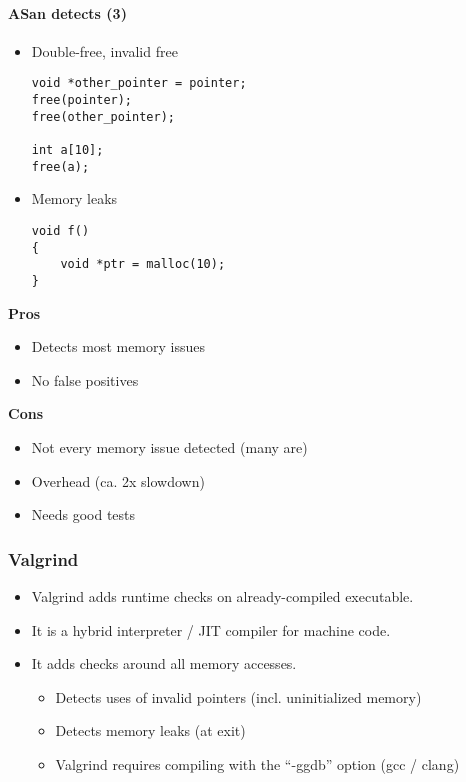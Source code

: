 \documentclass[12pt]{article}
\begin{document}
\paragraph{ASan detects (3)}

\begin{itemize}
    \item Double-free, invalid free
    
    \begin{lstlisting}
void *other_pointer = pointer;
free(pointer);
free(other_pointer);

int a[10];
free(a);
    \end{lstlisting}
    
    \item Memory leaks
    
    \begin{lstlisting}
void f()
{
    void *ptr = malloc(10);
}
    \end{lstlisting}
    
\end{itemize}

\textbf{Pros}
\begin{itemize}
    \item Detects most memory issues
    \item No false positives
\end{itemize}

\textbf{Cons}
\begin{itemize}
    \item Not every memory issue detected (many are)
    \item Overhead (ca. 2x slowdown)
    \item Needs good tests
\end{itemize}

\subsubsection{Valgrind}

\begin{itemize}
    \item Valgrind adds runtime checks on already-compiled executable.
    
    \item It is a hybrid interpreter / JIT compiler for machine code.
    
    \item It adds checks around all memory accesses.
    \begin{itemize}
        \item Detects uses of invalid pointers (incl. uninitialized memory)
        \item Detects memory leaks (at exit)
    \item Valgrind requires compiling with the ``-ggdb'' option (gcc / clang)
    \end{itemize}
\end{itemize}
\end{document}
